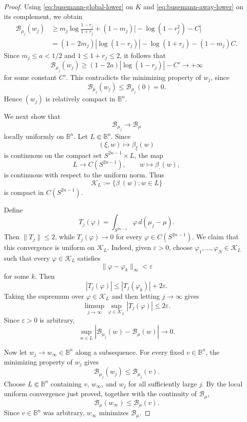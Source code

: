 \documentclass[11pt]{article}
\theoremstyle{definition}
\theoremstyle{remark}
\theoremstyle{definition}
\newcommand{\B}{\mathbb B}
\begin{document}
\begin{proof}
Using \eqref{eq:busemann-global-lower} on \(K\) and
\eqref{eq:busemann-away-lower} on its complement, we obtain
\[
\begin{aligned}
        \mathcal B_{\mu_j}(w_j)
        &\ge
        m_j\log\frac{1-r_j}{1+r_j}
        +(1-m_j)\bigl[-\log(1-r_j^2)-C\bigr] \\
        &=
        (1-2m_j)|\log(1-r_j)|
        -\log(1+r_j)-(1-m_j)C.
\end{aligned}
\]
Since \(m_j\le a<1/2\) and \(1\le 1+r_j\le2\), it follows that
\[
        \mathcal B_{\mu_j}(w_j)
        \ge
        (1-2a)|\log(1-r_j)|-C'
        \longrightarrow+\infty
\]
for some constant \(C'\). This contradicts the minimizing property of
\(w_j\), since
\[
        \mathcal B_{\mu_j}(w_j)
        \le
        \mathcal B_{\mu_j}(0)
        =0.
\]
Hence \((w_j)\) is relatively compact in \(\B^n\).

We next show that
\[
        \mathcal B_{\mu_j}\longrightarrow\mathcal B_\mu
\]
locally uniformly on \(\B^n\). Let \(L\Subset\B^n\). Since
\[
        (\xi,w)\longmapsto\beta_\xi(w)
\]
is continuous on the compact set \(S^{2n-1}\times L\), the map
\[
        L\longrightarrow C(S^{2n-1}),
        \qquad
        w\longmapsto\beta_{\cdot}(w),
\]
is continuous with respect to the uniform norm. Thus
\[
        \mathcal K_L
        :=
        \{\beta_{\cdot}(w):w\in L\}
\]
is compact in \(C(S^{2n-1})\).

Define
\[
        T_j(\varphi)
        =
        \int_{S^{2n-1}}\varphi\,d(\mu_j-\mu).
\]
Then \(\|T_j\|\le2\), while \(T_j(\varphi)\to0\) for every
\(\varphi\in C(S^{2n-1})\). We claim that this convergence is uniform on
\(\mathcal K_L\). Indeed, given \(\varepsilon>0\), choose
\(\varphi_1,\ldots,\varphi_N\in\mathcal K_L\) such that every
\(\varphi\in\mathcal K_L\) satisfies
\[
        \|\varphi-\varphi_k\|_\infty<\varepsilon
\]
for some \(k\). Then
\[
        |T_j(\varphi)|
        \le
        |T_j(\varphi_k)|+2\varepsilon.
\]
Taking the supremum over \(\varphi\in\mathcal K_L\) and then letting
\(j\to\infty\) gives
\[
        \limsup_{j\to\infty}
        \sup_{\varphi\in\mathcal K_L}|T_j(\varphi)|
        \le2\varepsilon.
\]
Since \(\varepsilon>0\) is arbitrary,
\[
        \sup_{w\in L}
        |\mathcal B_{\mu_j}(w)-\mathcal B_\mu(w)|
        \longrightarrow0.
\]

Now let \(w_j\to w_\infty\in\B^n\) along a subsequence. For every fixed
\(v\in\B^n\), the minimizing property of \(w_j\) gives
\[
        \mathcal B_{\mu_j}(w_j)
        \le
        \mathcal B_{\mu_j}(v).
\]
Choose \(L\Subset\B^n\) containing \(v\), \(w_\infty\), and \(w_j\) for all
sufficiently large \(j\). By the local uniform convergence just proved,
together with the continuity of \(\mathcal B_\mu\),
\[
        \mathcal B_\mu(w_\infty)
        \le
        \mathcal B_\mu(v).
\]
Since \(v\in\B^n\) was arbitrary, \(w_\infty\) minimizes
\(\mathcal B_\mu\).


\end{proof}
\end{document}
